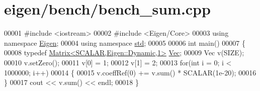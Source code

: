 \hypertarget{eigen_2bench_2bench__sum_8cpp_source}{}\section{eigen/bench/bench\+\_\+sum.cpp}
\label{eigen_2bench_2bench__sum_8cpp_source}

\begin{DoxyCode}
00001 \textcolor{preprocessor}{#include <iostream>}
00002 \textcolor{preprocessor}{#include <Eigen/Core>}
00003 \textcolor{keyword}{using namespace }\hyperlink{namespace_eigen}{Eigen};
00004 \textcolor{keyword}{using namespace }\hyperlink{namespacestd}{std};
00005 
00006 \textcolor{keywordtype}{int} main() 
00007 \{
00008   \textcolor{keyword}{typedef} \hyperlink{group___core___module_class_eigen_1_1_matrix}{Matrix<SCALAR,Eigen::Dynamic,1>} \hyperlink{group___core___module_class_eigen_1_1_matrix}{Vec};
00009   Vec v(SIZE);
00010   v.setZero();
00011   v[0] = 1;
00012   v[1] = 2;
00013   \textcolor{keywordflow}{for}(\textcolor{keywordtype}{int} i = 0; i < 1000000; i++)
00014   \{
00015     v.coeffRef(0) += v.sum() * SCALAR(1e-20);
00016   \}
00017   cout << v.sum() << endl;
00018 \}
\end{DoxyCode}
